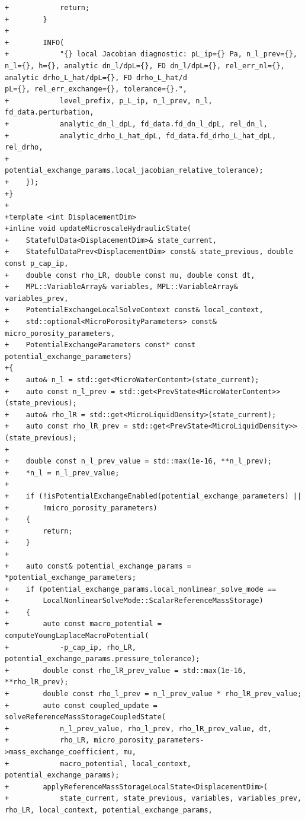 \documentclass[10pt]{article}
\begin{document}
\begin{lstlisting}
+            return;
+        }
+
+        INFO(
+            "{} local Jacobian diagnostic: pL_ip={} Pa, n_l_prev={}, n_l={}, h={}, analytic dn_l/dpL={}, FD dn_l/dpL={}, rel_err_nl={}, analytic drho_L_hat/dpL={}, FD drho_L_hat/d
pL={}, rel_err_exchange={}, tolerance={}.",
+            level_prefix, p_L_ip, n_l_prev, n_l, fd_data.perturbation,
+            analytic_dn_l_dpL, fd_data.fd_dn_l_dpL, rel_dn_l,
+            analytic_drho_L_hat_dpL, fd_data.fd_drho_L_hat_dpL, rel_drho,
+            potential_exchange_params.local_jacobian_relative_tolerance);
+    });
+}
+
+template <int DisplacementDim>
+inline void updateMicroscaleHydraulicState(
+    StatefulData<DisplacementDim>& state_current,
+    StatefulDataPrev<DisplacementDim> const& state_previous, double const p_cap_ip,
+    double const rho_LR, double const mu, double const dt,
+    MPL::VariableArray& variables, MPL::VariableArray& variables_prev,
+    PotentialExchangeLocalSolveContext const& local_context,
+    std::optional<MicroPorosityParameters> const& micro_porosity_parameters,
+    PotentialExchangeParameters const* const potential_exchange_parameters)
+{
+    auto& n_l = std::get<MicroWaterContent>(state_current);
+    auto const n_l_prev = std::get<PrevState<MicroWaterContent>>(state_previous);
+    auto& rho_lR = std::get<MicroLiquidDensity>(state_current);
+    auto const rho_lR_prev = std::get<PrevState<MicroLiquidDensity>>(state_previous);
+
+    double const n_l_prev_value = std::max(1e-16, **n_l_prev);
+    *n_l = n_l_prev_value;
+
+    if (!isPotentialExchangeEnabled(potential_exchange_parameters) ||
+        !micro_porosity_parameters)
+    {
+        return;
+    }
+
+    auto const& potential_exchange_params = *potential_exchange_parameters;
+    if (potential_exchange_params.local_nonlinear_solve_mode ==
+        LocalNonlinearSolveMode::ScalarReferenceMassStorage)
+    {
+        auto const macro_potential = computeYoungLaplaceMacroPotential(
+            -p_cap_ip, rho_LR, potential_exchange_params.pressure_tolerance);
+        double const rho_lR_prev_value = std::max(1e-16, **rho_lR_prev);
+        double const rho_l_prev = n_l_prev_value * rho_lR_prev_value;
+        auto const coupled_update = solveReferenceMassStorageCoupledState(
+            n_l_prev_value, rho_l_prev, rho_lR_prev_value, dt,
+            rho_LR, micro_porosity_parameters->mass_exchange_coefficient, mu,
+            macro_potential, local_context, potential_exchange_params);
+        applyReferenceMassStorageLocalState<DisplacementDim>(
+            state_current, state_previous, variables, variables_prev, rho_LR, local_context, potential_exchange_params,

\end{lstlisting}
\end{document}
